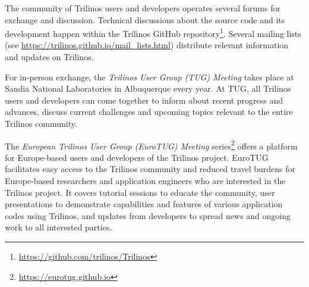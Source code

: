 
The community of Trilinos users and developers operates several forums for exchange and discussion.
Technical discussions about the source code and its development happen within the Trilinos GitHub repository\footnote{\url{https://github.com/trilinos/Trilinos}}.
Several mailing lists (see \url{https://trilinos.github.io/mail_lists.html}) distribute relevant information and updates on Trilinos.

For in-person exchange, the \emph{Trilinos User Group (TUG) Meeting} takes place at Sandia National Laboratories in Albuquerque every year.
At TUG, all Trilinos users and developers can come together to inform about recent progress and advances,
discuss current challenges and upcoming topics relevant to the entire Trilinos community.

The \emph{European Trilinos User Group (EuroTUG) Meeting} series\footnote{\url{https://eurotug.github.io}}
offers a platform for Europe-based users and developers of the Trilinos project.
EuroTUG facilitates easy access to the Trilinos community and reduced travel burdens for Europe-based researchers and application engineers
who are interested in the Trilinos project.
It covers tutorial sessions to educate the community,
user presentations to demonstrate capabilities and features of various application codes using Trilinos,
and updates from developers to spread news and ongoing work to all interested parties.
